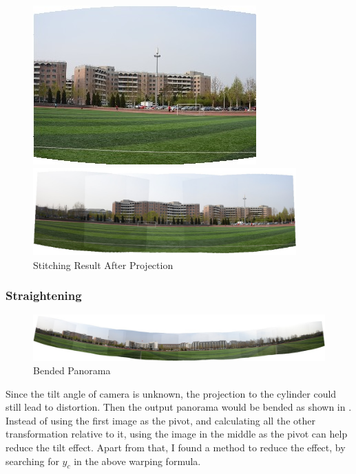 \begin{figure}[H]
  \begin{minipage}[b]{0.24\linewidth}
    \includegraphics[scale=0.3]{res/4.png}
  \end{minipage}

  \includegraphics[width=0.9\textwidth]{res/warped_stitch.png}
  \caption{Stitching Result After Projection\label{fig:cyl}}
\end{figure}

\subsubsection{Straightening}
\begin{figure}[H]
  \centering
  \includegraphics[width=\textwidth]{res/bend.jpg}
  \caption{Bended Panorama\label{fig:bend}}
\end{figure}

Since the tilt angle of camera is unknown,
the projection to the cylinder could still lead to distortion.
Then the output panorama would be bended as shown in .
Instead of using the first image as the pivot, and calculating all the other transformation relative to it,
using the image in the middle as the pivot can help reduce the tilt effect.
Apart from that, I found a method to reduce the effect, by searching for $ y_c$
in the above warping formula.

